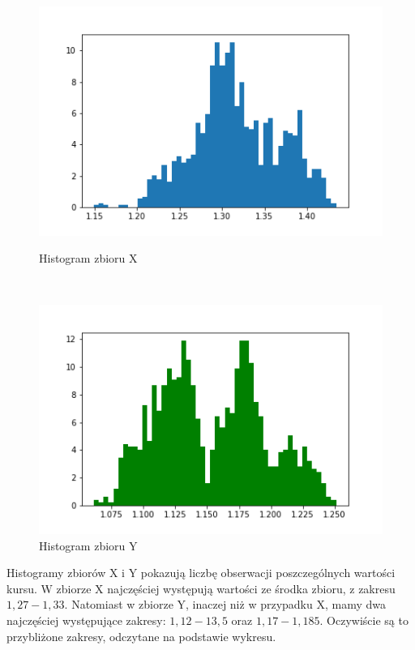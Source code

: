\documentclass[12pt]{mwart}
\begin{document}
\begin{figure}[H]
	\begin{minipage}{.5\linewidth}
		\centering
		\includegraphics[scale=0.7]{X_hist.PNG}
		\caption{Histogram zbioru X}
	\end{minipage}
	$\quad$
	\begin{minipage}{.5\linewidth}
		\centering
		\includegraphics[scale=0.7]{Y_hist.PNG}
		\caption{Histogram zbioru Y}
	\end{minipage}
\end{figure}
Histogramy zbiorów X i Y pokazują liczbę obserwacji poszczególnych wartości kursu. W zbiorze X najczęściej występują wartości ze środka zbioru, z zakresu $1,27-1,33$. Natomiast w zbiorze Y, inaczej niż w przypadku X, mamy dwa najczęściej występujące zakresy: $1,12-13,5$ oraz $1,17-1,185$. Oczywiście są to przybliżone zakresy, odczytane na podstawie wykresu.
\end{document}
